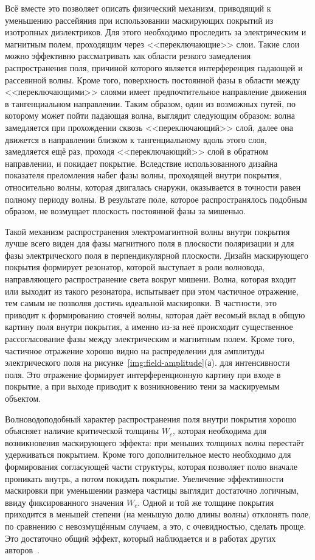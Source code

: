 Всё вместе это позволяет описать физический механизм, приводящий к
уменьшению рассейяния при использовании маскирующих покрытий из
изотропных диэлектриков. Для этого необходимо проследить за
электрическим и магнитным полем, проходящим через <<переключающие>>
слои.  Такие слои можно эффективно рассматривать как области резкого
замедления распространения поля, причиной которого является
интерференция падающей и рассеянной волны.  Кроме того, поверхность
постоянной фазы в области между <<переключающими>> слоями имеет
предпочтительное направление движения в тангенциальном направлении.
Таким образом, один из возможных путей, по которому может пойти
падающая волна, выглядит следующим образом: волна замедляется при
прохождении сквозь <<переключающий>> слой, далее она движется в
направлении близком к тангенциальному вдоль этого слоя, замедляется
ещё раз, проходя <<переключающий>> слой в обратном направлении, и
покидает покрытие.  Вследствие использованного дизайна показателя
преломления набег фазы волны, проходящей внутри покрытия, относительно
волны, которая двигалась снаружи, оказывается в точности равен полному
периоду волны.  В результате поле, которое распространялось подобным
образом, не возмущает плоскость постоянной фазы за мишенью.

Такой механизм распространения электромагинтной волны внутри покрытия
лучше всего виден для фазы магнитного поля в плоскости поляризации и
для фазы электрического поля в перпендикулярной плоскости. Дизайн
маскирующего покрытия формирует резонатор, которой выступает в роли
волновода, направляющего распространение света вокруг мишени. Волна,
которая входит или выходит из такого резонатора, испытывает при этом
частичное отражение, тем самым не позволяя достичь идеальной
маскировки. В частности, это приводит к формированию стоячей волны,
которая даёт весомый вклад в общую картину поля внутри покрытия, а
именно из-за неё происходит существенное рассогласование фазы между
электрическим и магнитным полем. Кроме того, частичное отражение
хорошо видно на распределении для амплитуды электрического поля на
рисунке~\ref{img:field-amplitude}(а).  для интенсивности поля. Это
отражение формирует интерференционную картину при входе в покрытие, а
при выходе приводит к возникновению тени за маскируемым объектом.

Волноводоподобный характер распространения поля внутри покрытия хорошо
объясняет наличие критической толщины $W_c$, которая необходима для
возникновения маскирующего эффекта: при меньших толщинах волна
перестаёт удерживаться покрытием. Кроме того дополнительное место
необходимо для формирования согласующей части структуры, которая
позволяет полю вначале проникать внутрь, а потом покидать
покрытие. Увеличение эффективности маскировки при уменьшении размера
частицы выглядит достаточно логичным, ввиду фиксированного значения
$W_c$.  Одной и той же толщине покрытия приходится в меньшей степени
(на меньшую долю длины волны) отклонять поле, по сравнению с
невозмущённым случаем, а это, с очевидностью, сделать проще. Это
достаточно общий эффект, который наблюдается и в работах других
авторов~\cite{Alu-2005,Semouchkina-2013}.


